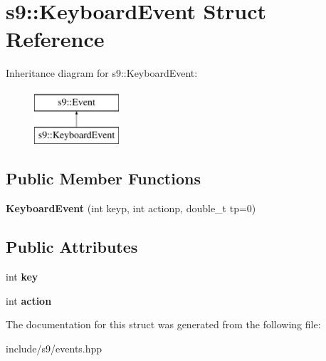 \hypertarget{structs9_1_1KeyboardEvent}{\section{s9\-:\-:Keyboard\-Event Struct Reference}
\label{structs9_1_1KeyboardEvent}
}
Inheritance diagram for s9\-:\-:Keyboard\-Event\-:\begin{figure}[H]
\begin{center}
\leavevmode
\includegraphics[height=2.000000cm]{structs9_1_1KeyboardEvent}
\end{center}
\end{figure}
\subsection*{Public Member Functions}
\begin{DoxyCompactItemize}
\item 
\hypertarget{structs9_1_1KeyboardEvent_a7d598c3b9f046fb45b1ffe13995e5ca8}{{\bfseries Keyboard\-Event} (int keyp, int actionp, double\-\_\-t tp=0)}\label{structs9_1_1KeyboardEvent_a7d598c3b9f046fb45b1ffe13995e5ca8}

\end{DoxyCompactItemize}
\subsection*{Public Attributes}
\begin{DoxyCompactItemize}
\item 
\hypertarget{structs9_1_1KeyboardEvent_ab1e7504602fbcf65946537704eef6b4b}{int {\bfseries key}}\label{structs9_1_1KeyboardEvent_ab1e7504602fbcf65946537704eef6b4b}

\item 
\hypertarget{structs9_1_1KeyboardEvent_ae166447666118a6289b25527003af9c3}{int {\bfseries action}}\label{structs9_1_1KeyboardEvent_ae166447666118a6289b25527003af9c3}

\end{DoxyCompactItemize}


The documentation for this struct was generated from the following file\-:\begin{DoxyCompactItemize}
\item 
include/s9/events.\-hpp\end{DoxyCompactItemize}
